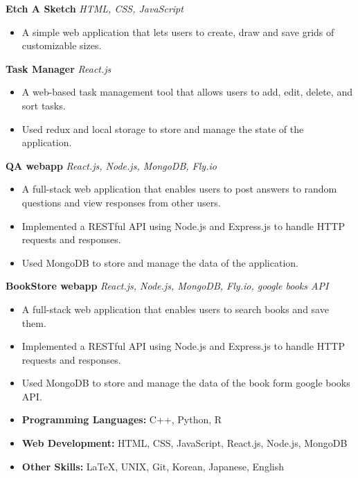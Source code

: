 \documentclass[a4paper,12pt]{article}
\begin{document}
\textbf{Etch A Sketch} 
\href{https://uliba3.github.io/Etch-A-Sketch/}{\faGlobe} 
\href{https://github.com/uliba3/Etch-A-Sketch}{\faGithub}
\textit{HTML, CSS, JavaScript}
\begin{itemize}
    \item A simple web application that lets users to create, draw and save grids of customizable sizes.
\end{itemize}
\textbf{Task Manager} 
\href{https://uliba3.github.io/TaskManager/}{\faGlobe}
\href{https://github.com/uliba3/TaskManager}{\faGithub}
\textit{React.js}
\begin{itemize}
    \item A web-based task management tool that allows users to add, edit, delete, and sort tasks.
    \item Used redux and local storage to store and manage the state of the application.
\end{itemize}
\textbf{QA webapp}
\href{https://white-voice-4708.fly.dev/}{\faGlobe}
\href{https://github.com/uliba3/Q-A-backend}{\faGithub}
\textit{React.js, Node.js, MongoDB, Fly.io}
\begin{itemize}
    \item A full-stack web application that enables users to post answers to random questions and view responses from other users.
    \item Implemented a RESTful API using Node.js and Express.js to handle HTTP requests and responses.
    \item Used MongoDB to store and manage the data of the application.
\end{itemize}
\textbf{BookStore webapp}
\href{https://bookstore-backend.fly.dev/}{\faGlobe}
\href{https://github.com/uliba3/BookStore-backend}{\faGithub}
\textit{React.js, Node.js, MongoDB, Fly.io, google books API}
\begin{itemize}
    \item A full-stack web application that enables users to search books and save them.
    \item Implemented a RESTful API using Node.js and Express.js to handle HTTP requests and responses.
    \item Used MongoDB to store and manage the data of the book form google books API.
\end{itemize}

\begin{itemize}
    \item \textbf{Programming Languages:} C++, Python, R
    \item \textbf{Web Development:} HTML, CSS, JavaScript, React.js, Node.js, MongoDB
    \item \textbf{Other Skills:} LaTeX, UNIX, Git, Korean, Japanese, English
\end{itemize}
\end{document}

